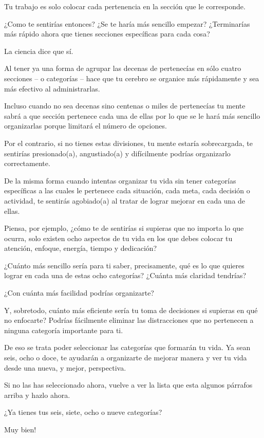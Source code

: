 \documentclass[12pt]{book}
\begin{document}
Tu trabajo es solo colocar cada pertenencia en la sección que le corresponde.

¿Como te sentirías entonces? ¿Se te haría más sencillo empezar? ¿Terminarías más rápido ahora que tienes secciones específicas para cada cosa?

La ciencia dice que sí.

Al tener ya una forma de agrupar las decenas de pertenecías en sólo cuatro secciones – o categorías – hace que tu cerebro se organice más rápidamente y sea más efectivo al administrarlas.

Incluso cuando no sea decenas sino centenas o miles de pertenecías tu mente sabrá a que sección pertenece cada una de ellas por lo que se le hará más sencillo organizarlas porque limitará el número de opciones.

Por el contrario, si no tienes estas divisiones, tu mente estaría sobrecargada, te sentirías presionado(a), angustiado(a) y difícilmente podrías organizarlo correctamente.

De la misma forma cuando intentas organizar tu vida sin tener categorías específicas a las cuales le pertenece cada situación, cada meta, cada decisión o actividad, te sentirás agobiado(a) al tratar de lograr mejorar en cada una de ellas.

Piensa, por ejemplo, ¿cómo te de sentirías si supieras que no importa lo que ocurra, solo existen ocho aspectos de tu vida en los que debes colocar tu atención, enfoque, energía, tiempo y dedicación?

¿Cuánto más sencillo sería para ti saber, precisamente, qué es lo que quieres lograr en cada una de estas ocho categorías? ¿Cuánta más claridad tendrías?

¿Con cuánta más facilidad podrías organizarte?

Y, sobretodo, cuánto más eficiente sería tu toma de decisiones si supieras en qué no enfocarte? Podrías fácilmente eliminar las distracciones que no pertenecen a ninguna categoría importante para ti.

De eso se trata poder seleccionar las categorías que formarán tu vida. Ya sean seis, ocho o doce, te ayudarán a organizarte de mejorar manera y ver tu vida desde una nueva, y mejor, perspectiva.

Si no las has seleccionado ahora, vuelve a ver la lista que esta algunos párrafos arriba y hazlo ahora.

¿Ya tienes tus seis, siete, ocho o nueve categorías?

Muy bien!
\end{document}
